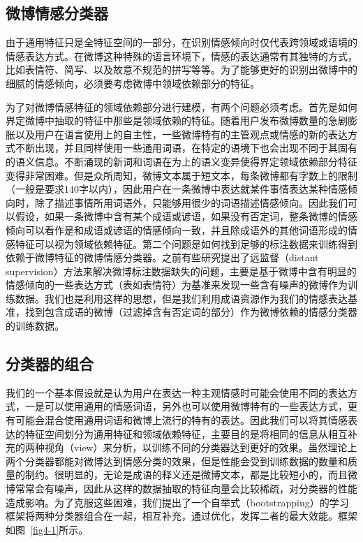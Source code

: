 \subsection{微博情感分类器}
\label{context}
由于通用特征只是全特征空间的一部分，在识别情感倾向时仅代表跨领域或语境的情感表达方式。在微博这种特殊的语言环境下，情感的表达通常有其独特的方式，比如表情符、简写、以及故意不规范的拼写等等。为了能够更好的识别出微博中的细腻的情感倾向，必须要考虑微博中领域依赖部分的特征。

为了对微博情感特征的领域依赖部分进行建模，有两个问题必须考虑。首先是如何界定微博中抽取的特征中那些是领域依赖的特征。随着用户发布微博数量的急剧膨胀以及用户在语言使用上的自主性，一些微博特有的主管观点或情感的新的表达方式不断出现，并且同样使用一些通用词语，在特定的语境下也会出现不同于其固有的语义信息。不断涌现的新词和词语在为上的语义变异使得界定领域依赖部分特征变得非常困难。但是众所周知，微博文本属于短文本，每条微博都有字数上的限制（一般是要求140字以内），因此用户在一条微博中表达就某件事情表达某种情感倾向时，除了描述事情所用词语外，只能够用很少的词语描述情感倾向。因此我们可以假设，如果一条微博中含有某个成语或谚语，如果没有否定词，整条微博的情感倾向可以看作是和成语或谚语的情感倾向一致，并且除成语外的其他词语形成的情感特征可以视为领域依赖特征。第二个问题是如何找到足够的标注数据来训练得到依赖于微博特征的微博情感分类器。之前有些研究提出了远监督（distant supervision）方法来解决微博标注数据缺失的问题，主要是基于微博中含有明显的情感倾向的一些表达方式（表如表情符）为基准来发现一些含有噪声的微博作为训练数据。我们也是利用这样的思想，但是我们利用成语资源作为我们的情感表达基准，找到包含成语的微博（过滤掉含有否定词的部分）作为微博依赖的情感分类器的训练数据。

\subsection{分类器的组合}
\label{combination}
我们的一个基本假设就是认为用户在表达一种主观情感时可能会使用不同的表达方式，一是可以使用通用的情感词语，另外也可以使用微博特有的一些表达方式，更有可能会混合使用通用词语和微博上流行的特有的表达。因此我们可以将其情感表达的特征空间划分为通用特征和领域依赖特征，主要目的是将相同的信息从相互补充的两种视角（view）来分析，以训练不同的分类器达到更好的效果。虽然理论上两个分类器都能对微博达到情感分类的效果，但是性能会受到训练数据的数量和质量的制约。很明显的，无论是成语的释义还是微博文本，都是比较短小的，而且微博常常会有噪声，因此从这样的数据抽取的特征向量会比较稀疏，对分类器的性能造成影响。为了克服这些困难，我们提出了一个自举式（bootstrapping）的学习框架将两种分类器组合在一起，相互补充，通过优化，发挥二者的最大效能。框架如图~\ref{fig4-1}所示。

